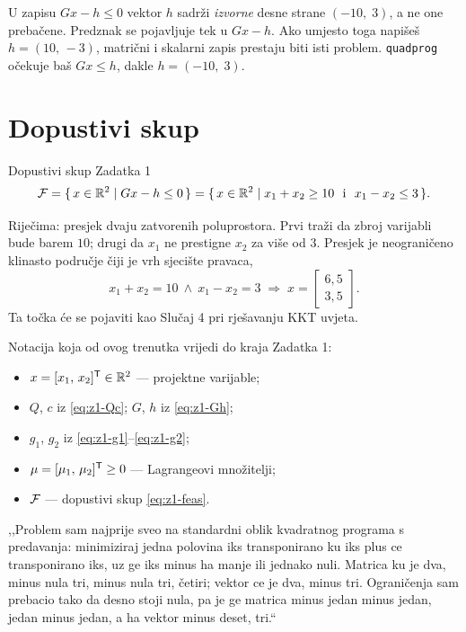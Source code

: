 \begin{zamka}
U zapisu $Gx - h \leq 0$ vektor $h$ sadrži \emph{izvorne} desne strane
$(-10,\; 3)$, a ne one prebačene. Predznak se pojavljuje tek u $Gx - h$. Ako
umjesto toga napišeš $h = (10,\,-3)$, matrični i skalarni zapis prestaju biti
isti problem. \texttt{quadprog} očekuje baš $Gx \leq h$, dakle $h = (-10,\;3)$.
\end{zamka}

\section{Dopustivi skup}
\label{sec:z1-dopustivi-skup}

\begin{pojam}{Dopustivi skup Zadatka 1}
\begin{equation}
\mathcal{F} = \{\, x \in \mathbb{R}^2 \mid Gx - h \leq 0 \,\}
      = \{\, x \in \mathbb{R}^2 \mid x_1 + x_2 \geq 10 \ \text{ i } \ x_1 - x_2 \leq 3 \,\}.
\label{eq:z1-feas}
\end{equation}
\end{pojam}

Riječima: presjek dvaju zatvorenih poluprostora. Prvi traži da zbroj varijabli
bude barem $10$; drugi da $x_1$ ne prestigne $x_2$ za više od $3$. Presjek je
neograničeno klinasto područje čiji je vrh sjecište pravaca,
\begin{equation}
x_1 + x_2 = 10 \ \wedge \ x_1 - x_2 = 3
\;\Longrightarrow\;
x = \begin{bmatrix} 6{,}5 \\ 3{,}5 \end{bmatrix}.
\label{eq:z1-vrh}
\end{equation}
Ta točka će se pojaviti kao Slučaj 4 pri rješavanju KKT uvjeta.

\begin{predznanje}
Notacija koja od ovog trenutka vrijedi do kraja Zadatka 1:
\begin{itemize}[nosep,leftmargin=*]
  \item $x = [x_1,\, x_2]^{\mathsf{T}} \in \mathbb{R}^2$ --- projektne varijable;
  \item $Q$, $c$ iz \eqref{eq:z1-Qc}; $G$, $h$ iz \eqref{eq:z1-Gh};
  \item $g_1$, $g_2$ iz \eqref{eq:z1-g1}--\eqref{eq:z1-g2};
  \item $\mu = [\mu_1,\, \mu_2]^{\mathsf{T}} \geq 0$ --- Lagrangeovi množitelji;
  \item $\mathcal{F}$ --- dopustivi skup \eqref{eq:z1-feas}.
\end{itemize}
\end{predznanje}

\begin{izgovor}
,,Problem sam najprije sveo na standardni oblik kvadratnog programa s
predavanja: minimiziraj jedna polovina iks transponirano ku iks plus ce
transponirano iks, uz ge iks minus ha manje ili jednako nuli. Matrica ku je dva,
minus nula tri, minus nula tri, četiri; vektor ce je dva, minus tri. Ograničenja
sam prebacio tako da desno stoji nula, pa je ge matrica minus jedan minus jedan,
jedan minus jedan, a ha vektor minus deset, tri.``
\end{izgovor}
